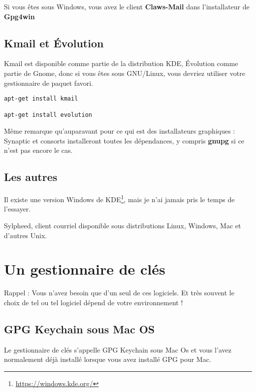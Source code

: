 Si vous êtes sous Windows, vous avez le client \textbf{Claws-Mail} dans
l'installateur de \textbf{Gpg4win}

\subsection{Kmail et Évolution}\label{kmail-et-uxe9volution}

Kmail est disponible comme partie de la distribution KDE, Évolution
comme partie de Gnome, donc si vous êtes sous GNU/Linux, vous devriez
utiliser votre gestionnaire de paquet favori.

\begin{lstlisting}
apt-get install kmail

apt-get install evolution
\end{lstlisting}

Même remarque qu'auparavant pour ce qui est des installateurs graphiques
: Synaptic et consorts installeront toutes les dépendances, y compris
\textbf{gnupg} si ce n'est pas encore le cas.

\subsection{Les autres}\label{les-autres}

Il existe une version Windows de KDE\footnote{\url{https://windows.kde.org/}},
mais je n'ai jamais pris le temps de l'essayer.

Sylpheed, client courriel disponible sous distributions Linux, Windows,
Mac et d'autres Unix.

\section{Un gestionnaire de clés}\label{un-gestionnaire-de-cluxe9s}

\begin{notice}
Rappel : Vous n'avez besoin que d'un seul de ces logiciels. Et très
souvent le choix de tel ou tel logiciel dépend de votre environnement !
\end{notice}

\subsection{GPG Keychain sous Mac OS}\label{gpg-keychain-sous-mac-os}

Le gestionnaire de clés s'appelle GPG Keychain sous Mac Os et vous
l'avez normalement déjà installé lorsque vous avez installé GPG pour
Mac.

